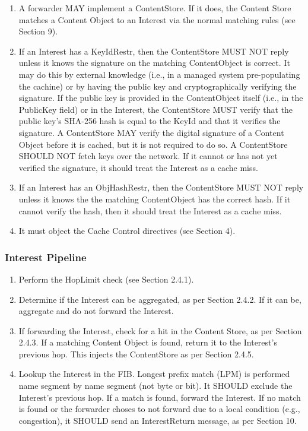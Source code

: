 \documentclass[12pt]{report}
\begin{document}
\begin{enumerate}
\item  A forwarder MAY implement a ContentStore.  If it does, the
    Content Store matches a Content Object to an Interest via the
    normal matching rules (see Section 9).

\item  If an Interest has a KeyIdRestr, then the ContentStore MUST NOT
    reply unless it knows the signature on the matching ContentObject
    is correct.  It may do this by external knowledge (i.e., in a
    managed system pre-populating the cachine) or by having the
    public key and cryptographically verifying the signature.  If the
    public key is provided in the ContentObject itself (i.e., in the
    PublicKey field) or in the Interest, the ContentStore MUST verify
    that the public key's SHA-256 hash is equal to the KeyId and that
    it verifies the signature.  A ContentStore MAY verify the digital
    signature of a Content Object before it is cached, but it is not
    required to do so.  A ContentStore SHOULD NOT fetch keys over the
    network.  If it cannot or has not yet verified the signature, it
    should treat the Interest as a cache miss.

\item  If an Interest has an ObjHashRestr, then the ContentStore MUST
    NOT reply unless it knows the the matching ContentObject has the
    correct hash.  If it cannot verify the hash, then it should treat
    the Interest as a cache miss.

\item  It must object the Cache Control directives (see Section 4).
\end{enumerate}

\subsubsection{Interest Pipeline}
\begin{enumerate}
\item  Perform the HopLimit check (see Section 2.4.1).

\item Determine if the Interest can be aggregated, as per
     Section 2.4.2.  If it can be, aggregate and do not forward the
     Interest.


\item If forwarding the Interest, check for a hit in the Content Store,
    as per Section 2.4.3.  If a matching Content Object is found,
    return it to the Interest's previous hop.  This injects the
    ContentStore as per Section 2.4.5.

\item Lookup the Interest in the FIB.  Longest prefix match (LPM) is
    performed name segment by name segment (not byte or bit).  It
    SHOULD exclude the Interest's previous hop.  If a match is found,
    forward the Interest.  If no match is found or the forwarder
    choses to not forward due to a local condition (e.g.,
    congestion), it SHOULD send an InterestReturn message, as per
    Section 10.
\end{enumerate}
\end{document}
